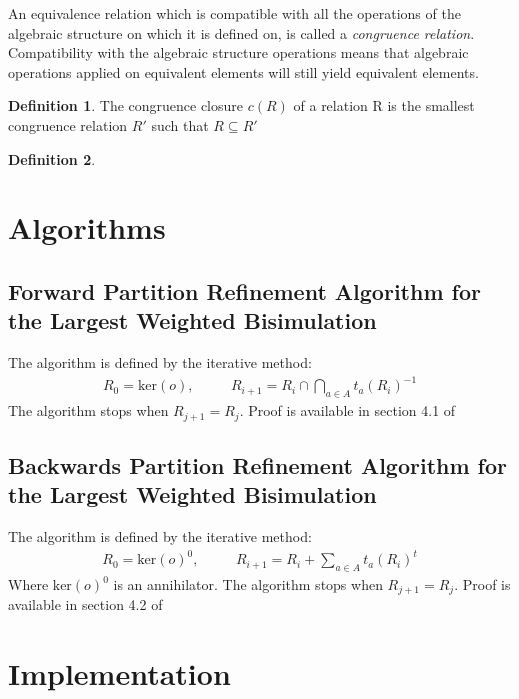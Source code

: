 \documentclass{article}
\theoremstyle{plain}%
\theoremstyle{definition}
\newtheorem{defn}{Definition}[section]
\theoremstyle{remark}
\newcommand{\mker}[1]{\text{ker}\left(#1\right)}
\begin{document}
An equivalence relation which is compatible with all the operations of
the algebraic structure on which it is defined on, is called a 
\textit{congruence relation}. Compatibility with the algebraic structure operations
means that algebraic operations applied on equivalent elements will still
yield equivalent elements. 


\begin{defn}
  The congruence closure $c(R)$ of a relation R is the smallest congruence relation 
  $R'$ such that $R \subseteq R'$ 
\end{defn}

\begin{defn}
  \textbf{} \\
  
\end{defn}

\section{Algorithms}

\subsection{Forward Partition Refinement Algorithm for the Largest Weighted Bisimulation}
\label{sec:algo2}

The algorithm is defined by the iterative method:
\begin{eqnarray}
  R_0 = \mker{o}, & \quad & R_{i+1} = R_i \cap \bigcap_{a \in A} t_a(R_i)^{-1} \label{fwd} 
\end{eqnarray}
The algorithm stops when $R_{j+1} = R_j$. Proof is available in section 4.1 of \cite{BONCHI201277}


\subsection{Backwards Partition Refinement Algorithm for the Largest Weighted Bisimulation}
\label{sec:algo2}

The algorithm is defined by the iterative method:
\begin{eqnarray}
  R_0 = \mker{o}^0, & \quad & R_{i+1} = R_i + \sum_{a \in A} t_a(R_i)^t \label{back} 
\end{eqnarray}
Where $\mker{o}^0$ is an annihilator.
The algorithm stops when $R_{j+1} = R_j$. Proof is available in section 4.2 of \cite{BONCHI201277}

\section{Implementation}
\label{sec:impl}
\end{document}
